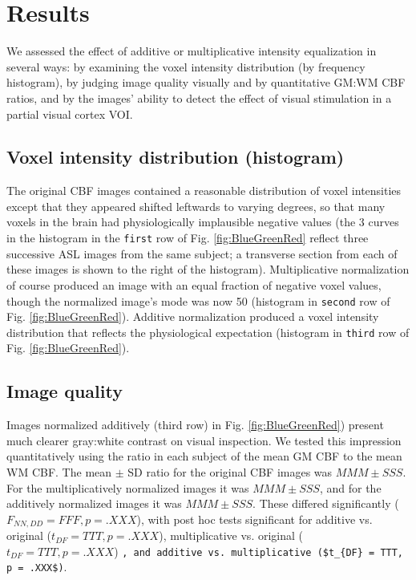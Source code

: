 \section{Results}
We assessed the effect of additive or multiplicative intensity equalization in several ways: by examining the voxel intensity distribution (by frequency histogram), by judging image quality visually and by quantitative GM:WM CBF ratios, and by the images' ability to detect the effect of visual stimulation in a partial visual cortex VOI. 

\subsection{Voxel intensity distribution (histogram)}
The original CBF images contained a reasonable distribution of voxel intensities except that they appeared shifted leftwards to varying degrees, so that many voxels in the brain had physiologically implausible negative values (the 3 curves in the histogram in the \verb|first| row of Fig. \ref{fig:BlueGreenRed} reflect three successive ASL images from the same subject; a transverse section from each of these images is shown to the right of the histogram). Multiplicative normalization of course produced an image with an equal fraction of negative voxel values, though the normalized image's mode was now 50 (histogram in \verb|second| row of Fig. \ref{fig:BlueGreenRed}). Additive normalization produced a voxel intensity distribution that reflects the physiological expectation (histogram in \verb|third| row of Fig. \ref{fig:BlueGreenRed}). 

\subsection{Image quality}
Images normalized additively (third row) in Fig. \ref{fig:BlueGreenRed}) present much clearer gray:white contrast on visual inspection. We tested this impression quantitatively using the ratio in each subject of the mean GM CBF to the mean WM CBF. The mean $\pm$ SD ratio for the original CBF images was $MMM \pm SSS$. For the multiplicatively normalized images it was $MMM \pm SSS$, and for the additively normalized images it was $MMM \pm SSS$. These differed significantly ($F_{NN,DD} = FFF, p = .XXX$), with post hoc tests significant for additive vs. original ($t_{DF} = TTT, p = .XXX$), multiplicative vs. original ($t_{DF} = TTT, p = .XXX$) \verb|, and additive vs. multiplicative ($t_{DF} = TTT, p = .XXX$)|.

